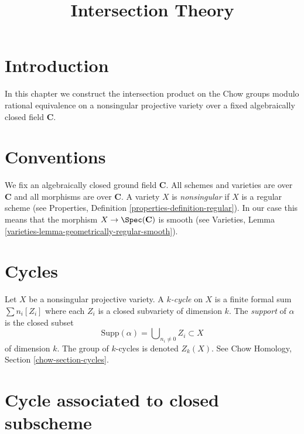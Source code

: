 

%


\title{Intersection Theory}


\maketitle

\label{section-phantom}

\tableofcontents


\section{Introduction}
\label{section-introduction}

\noindent
In this chapter we construct the intersection product on the
Chow groups modulo rational equivalence on a nonsingular projective
variety over a fixed algebraically closed field $\mathbf{C}$.


\section{Conventions}
\label{section-conventions}

\noindent
We fix an algebraically closed ground field $\mathbf{C}$.
All schemes and varieties are over $\mathbf{C}$ and all
morphisms are over $\mathbf{C}$. A variety $X$ is
{\it nonsingular} if $X$ is a regular scheme (see
Properties, Definition \ref{properties-definition-regular}).
In our case this means that the morphism $X \to \Spec(\mathbf{C})$
is smooth (see
Varieties, Lemma \ref{varieties-lemma-geometrically-regular-smooth}).


\section{Cycles}
\label{section-cycles}

\noindent
Let $X$ be a nonsingular projective variety.
A {\it $k$-cycle} on $X$ is a finite formal sum $\sum n_i [Z_i]$
where each $Z_i$ is a closed subvariety of dimension $k$.
The {\it support} of $\alpha$ is the closed subset
$$
\text{Supp}(\alpha) = \bigcup\nolimits_{n_i \not = 0} Z_i \subset X
$$
of dimension $k$. The group of $k$-cycles is denoted $Z_k(X)$.
See Chow Homology, Section \ref{chow-section-cycles}.


\section{Cycle associated to closed subscheme}
\label{section-cycle-of-closed}

